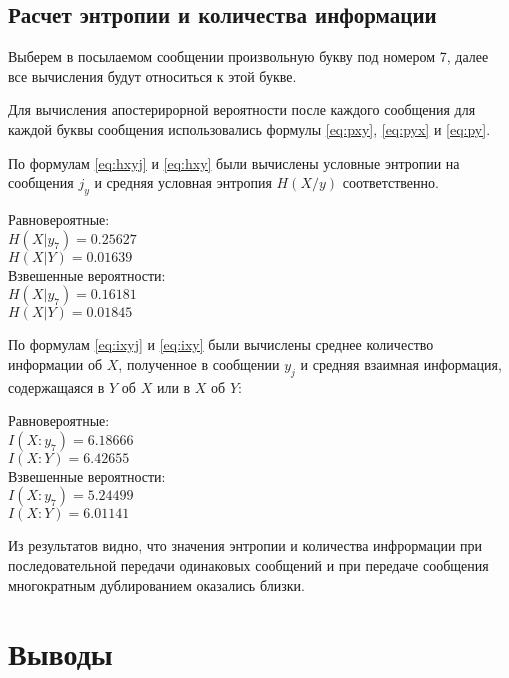 \subsection{Расчет энтропии и количества информации}

Выберем в посылаемом сообщении произвольную букву под номером 7, далее все вычисления будут относиться к этой букве.

Для вычисления апостерирорной вероятности после каждого сообщения для каждой буквы сообщения использовались формулы \ref{eq:pxy}, \ref{eq:pyx} и \ref{eq:py}.

По формулам \ref{eq:hxyj} и \ref{eq:hxy} были вычислены условные энтропии на сообщения $j_y$ и средняя условная энтропия $H(X/y)$ соответственно. 

\begin{multicols}{2}
\begin{center}
Равновероятные:\\
$H(X|y_7) = 0.25627$\\
$H(X|Y) = 0.01639$\\
Взвешенные вероятности:\\
$H(X|y_7) = 0.16181$\\
$H(X|Y) = 0.01845$
\end{center}
\end{multicols}

По формулам \ref{eq:ixyj} и \ref{eq:ixy} были вычислены среднее количество информации об $X$, полученное в сообщении $y_j$ и средняя взаимная информация, содержащаяся в $Y$ об $X$ или в $X$ об $Y$: 

\begin{multicols}{2}
\begin{center}
Равновероятные:\\
$I(X:y_7) = 6.18666$\\
$I(X:Y) = 6.42655$\\
Взвешенные вероятности:\\
$I(X:y_7) = 5.24499$\\
$I(X:Y) = 6.01141$
\end{center}
\end{multicols}

Из результатов видно, что значения энтропии и количества инфрормации при последовательной передачи одинаковых сообщений и при передаче сообщения многократным дублированием оказались близки.

\section{Выводы}

